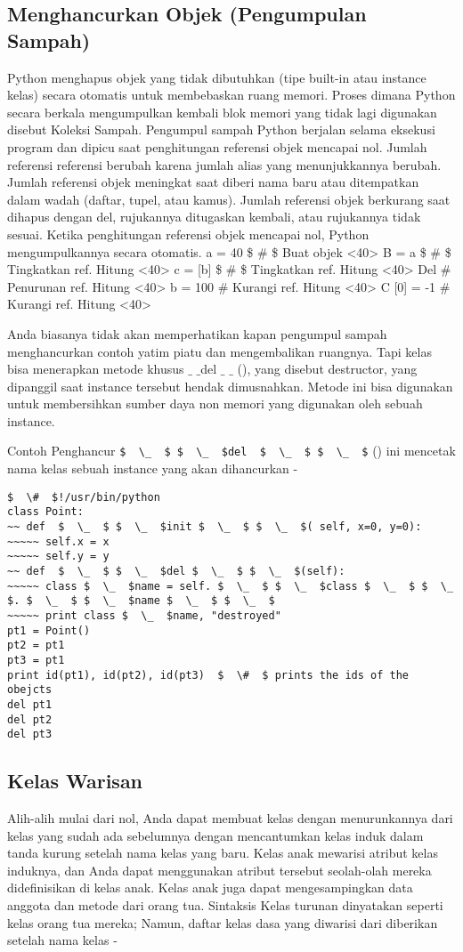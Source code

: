 \subsection{Menghancurkan Objek (Pengumpulan Sampah)}
Python menghapus objek yang tidak dibutuhkan (tipe built-in atau instance kelas) secara otomatis untuk membebaskan ruang memori. Proses dimana Python secara berkala mengumpulkan kembali blok memori yang tidak lagi digunakan disebut Koleksi Sampah. Pengumpul sampah Python berjalan selama eksekusi program dan dipicu saat penghitungan referensi objek mencapai nol. Jumlah referensi referensi berubah karena jumlah alias yang menunjukkannya berubah. Jumlah referensi objek meningkat saat diberi nama baru atau ditempatkan dalam wadah (daftar, tupel, atau kamus). Jumlah referensi objek berkurang saat dihapus dengan del, rujukannya ditugaskan kembali, atau rujukannya tidak sesuai. Ketika penghitungan referensi objek mencapai nol, Python mengumpulkannya secara otomatis.
a = 40  \$  \#  \$ Buat objek <40>
B = a  \$  \#  \$ Tingkatkan ref. Hitung <40>
c = [b]  \$  \#  \$ Tingkatkan ref. Hitung <40>
Del  $  \#  $ Penurunan ref. Hitung <40>
b = 100  $  \#  $ Kurangi ref. Hitung <40>
C [0] = -1  $  \#  $ Kurangi ref. Hitung <40>


Anda biasanya tidak akan memperhatikan kapan pengumpul sampah menghancurkan contoh yatim piatu dan mengembalikan ruangnya. Tapi kelas bisa menerapkan metode khusus  $  \_  $ $  \_  $del  $  \_  $ $  \_ $ (), yang disebut destructor, yang dipanggil saat instance tersebut hendak dimusnahkan. Metode ini bisa digunakan untuk membersihkan sumber daya non memori yang digunakan oleh sebuah instance. \par

Contoh
Penghancur  \verb|$  \_  $ $  \_  $del  $  \_  $ $  \_  $| () ini mencetak nama kelas sebuah instance yang akan dihancurkan -
\begin{verbatim}
$  \#  $!/usr/bin/python
class Point:
~~ def  $  \_  $ $  \_  $init $  \_  $ $  \_  $( self, x=0, y=0):
~~~~~ self.x = x
~~~~~ self.y = y
~~ def  $  \_  $ $  \_  $del $  \_  $ $  \_  $(self):
~~~~~ class $  \_  $name = self. $  \_  $ $  \_  $class $  \_  $ $  \_  $. $  \_  $ $  \_  $name $  \_  $ $  \_  $
~~~~~ print class $  \_  $name, "destroyed"
pt1 = Point()
pt2 = pt1
pt3 = pt1
print id(pt1), id(pt2), id(pt3)  $  \#  $ prints the ids of the obejcts
del pt1
del pt2
del pt3
\end{verbatim}

\subsection{Kelas Warisan}
Alih-alih mulai dari nol, Anda dapat membuat kelas dengan menurunkannya dari kelas yang sudah ada sebelumnya dengan mencantumkan kelas induk dalam tanda kurung setelah nama kelas yang baru. Kelas anak mewarisi atribut kelas induknya, dan Anda dapat menggunakan atribut tersebut seolah-olah mereka didefinisikan di kelas anak. Kelas anak juga dapat mengesampingkan data anggota dan metode dari orang tua. Sintaksis Kelas turunan dinyatakan seperti kelas orang tua mereka; Namun, daftar kelas dasa yang diwarisi dari diberikan setelah nama kelas -

